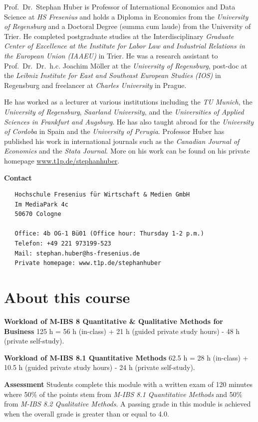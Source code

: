\documentclass[
  12pt,
  oneside]{book}
\theoremstyle{definition}
\theoremstyle{definition}
\theoremstyle{definition}
\theoremstyle{definition}
\theoremstyle{remark}
\begin{document}
Prof.~Dr.~Stephan Huber is Professor of International Economics and Data Science at \emph{HS Fresenius} and holds a Diploma in Economics from the \emph{University of Regensburg} and a Doctoral Degree (summa cum laude) from the University of Trier. He completed postgraduate studies at the Interdisciplinary \emph{Graduate Center of Excellence at the Institute for Labor Law and Industrial Relations in the European Union (IAAEU)} in Trier. He was a research assistant to Prof.~Dr.~Dr.~h.c. Joachim Möller at the \emph{University of Regensburg}, post-doc at the \emph{Leibniz Institute for East and Southeast European Studies (IOS)} in Regensburg and freelancer at \emph{Charles University} in Prague.

He has worked as a lecturer at various institutions including the \emph{TU Munich}, the \emph{University of Regensburg}, \emph{Saarland University}, and the \emph{Universities of Applied Sciences in Frankfurt and Augsburg}. He has also taught abroad for the \emph{University of Cordoba} in Spain and the \emph{University of Perugia}. Professor Huber has published his work in international journals such as the \emph{Canadian Journal of Economics} and the \emph{Stata Journal}. More on his work can be found on his private homepage \href{https://www.t1p.de/stephanhuber}{www.t1p.de/stephanhuber}.

\textbf{Contact}

\begin{verbatim}
   Hochschule Fresenius für Wirtschaft & Medien GmbH
   Im MediaPark 4c
   50670 Cologne
   
   Office: 4b OG-1 Bü01 (Office hour: Thursday 1-2 p.m.)
   Telefon: +49 221 973199-523
   Mail: stephan.huber@hs-fresenius.de
   Private homepage: www.t1p.de/stephanhuber
\end{verbatim}

\hypertarget{about-this-course}{%
\section*{About this course}\label{about-this-course}}

\textbf{Workload of M-IBS 8 Quantitative \& Qualitative Methods for Business}
125 h = 56 h (in-class) + 21 h (guided private study hours) - 48 h (private self-study).

\textbf{Workload of M-IBS 8.1 Quantitative Methods}
62.5 h = 28 h (in-class) + 10.5 h (guided private study hours) - 24 h (private self-study).

\textbf{Assessment}
Students complete this module with a written exam of 120 minutes where 50\% of the points stem from \emph{M-IBS 8.1 Quantitative Methods} and 50\% from \emph{M-IBS 8.2 Qualitative Methods}. A passing grade in this module is achieved when the overall grade is greater than or equal to 4.0.
\end{document}
